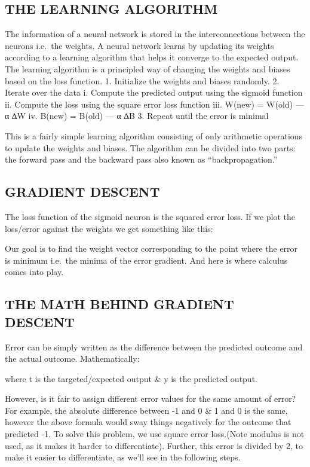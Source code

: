 \documentclass[11pt]{article}
\begin{document}
    \hypertarget{the-learning-algorithm}{%
\subsection{THE LEARNING ALGORITHM}\label{the-learning-algorithm}}

    The information of a neural network is stored in the interconnections
between the neurons i.e.~the weights. A neural network learns by
updating its weights according to a learning algorithm that helps it
converge to the expected output. The learning algorithm is a principled
way of changing the weights and biases based on the loss function. 1.
Initialize the weights and biases randomly. 2. Iterate over the data i.
Compute the predicted output using the sigmoid function ii. Compute the
loss using the square error loss function iii. W(new) = W(old) --- α ∆W
iv. B(new) = B(old) --- α ∆B 3. Repeat until the error is minimal

This is a fairly simple learning algorithm consisting of only arithmetic
operations to update the weights and biases. The algorithm can be
divided into two parts: the forward pass and the backward pass also
known as ``backpropagation.''

    \hypertarget{gradient-descent}{%
\subsection{GRADIENT DESCENT}\label{gradient-descent}}

    The loss function of the sigmoid neuron is the squared error loss. If we
plot the loss/error against the weights we get something like this:

Our goal is to find the weight vector corresponding to the point where
the error is minimum i.e.~the minima of the error gradient. And here is
where calculus comes into play.

    \hypertarget{the-math-behind-gradient-descent}{%
\subsection{THE MATH BEHIND GRADIENT
DESCENT}\label{the-math-behind-gradient-descent}}

    Error can be simply written as the difference between the predicted
outcome and the actual outcome. Mathematically:

where t is the targeted/expected output \& y is the predicted output.

However, is it fair to assign different error values for the same amount
of error? For example, the absolute difference between -1 and 0 \& 1 and
0 is the same, however the above formula would sway things negatively
for the outcome that predicted -1. To solve this problem, we use square
error loss.(Note modulus is not used, as it makes it harder to
differentiate). Further, this error is divided by 2, to make it easier
to differentiate, as we'll see in the following steps.
\end{document}
